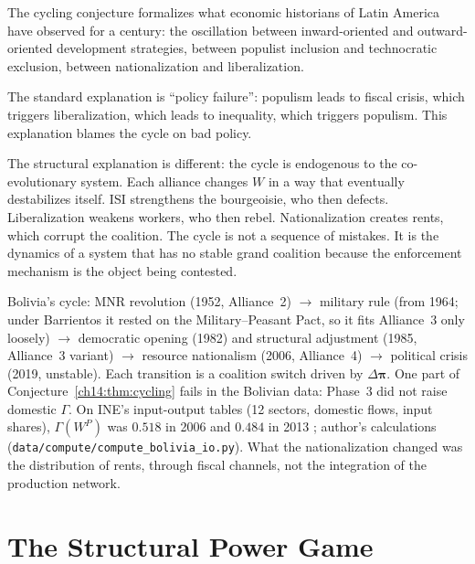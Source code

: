 \documentclass[../structural_economics_book.tex]{subfiles}
\begin{document}
\begin{prebisch}
The cycling conjecture formalizes what economic historians of Latin America have observed for a century: the oscillation between inward-oriented and outward-oriented development strategies, between populist inclusion and technocratic exclusion, between nationalization and liberalization.

The standard explanation is ``policy failure'': populism leads to fiscal crisis, which triggers liberalization, which leads to inequality, which triggers populism. This explanation blames the cycle on bad policy.

The structural explanation is different: the cycle is endogenous to the co-evolutionary system. Each alliance changes $W$ in a way that eventually destabilizes itself. ISI strengthens the bourgeoisie, who then defects. Liberalization weakens workers, who then rebel. Nationalization creates rents, which corrupt the coalition. The cycle is not a sequence of mistakes. It is the dynamics of a system that has no stable grand coalition because the enforcement mechanism is the object being contested.

Bolivia's cycle: MNR revolution (1952, Alliance~2) $\to$ military rule (from 1964; under Barrientos it rested on the Military--Peasant Pact, so it fits Alliance~3 only loosely) $\to$ democratic opening (1982) and structural adjustment (1985, Alliance~3 variant) $\to$ resource nationalism (2006, Alliance~4) $\to$ political crisis (2019, unstable). Each transition is a coalition switch driven by $\Delta\boldsymbol{\pi}$. One part of Conjecture~\ref{ch14:thm:cycling} fails in the Bolivian data: Phase~3 did not raise domestic $\Gamma$. On INE's input-output tables (12 sectors, domestic flows, input shares), $\Gamma(W^P)$ was $0.518$ in 2006 and $0.484$ in 2013 \citep{ine2026sut}; author's calculations (\texttt{data/compute/compute\_bolivia\_io.py}). What the nationalization changed was the distribution of rents, through fiscal channels, not the integration of the production network.
\end{prebisch}


\section{The Structural Power Game}
\label{ch14:sec:game}
\end{document}
